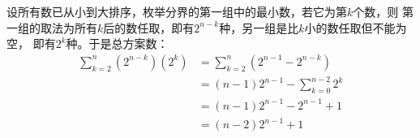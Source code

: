 \begin{solution}
    设所有数已从小到大排序，枚举分界的第一组中的最小数，若它为第$k$个数，则
    第一组的取法为所有$k$后的数任取，即有$2^{n-k}$种，另一组是比$k$小的数任取但不能为空，
    即有$2^{k}$种。于是总方案数：
    \begin{align*}
        \sum_{k=2}^n(2^{n-k})(2^{k}) &= \sum_{k=2}^n(2^{n-1}-2^{n-k})\\
        &= (n-1)2^{n-1} - \sum_{k=0}^{n-2} 2^k\\
        &= (n-1)2^{n-1} - 2^{n-1} + 1\\
        &= (n-2)2^{n-1} + 1
    \end{align*}
\end{solution}